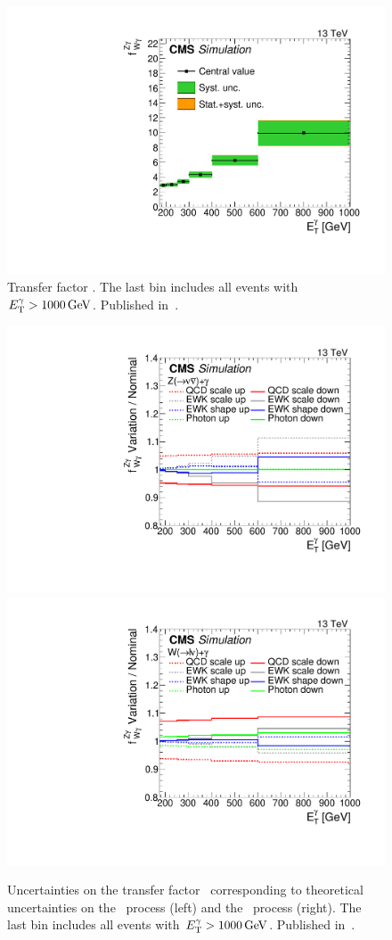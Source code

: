 \begin{figure}[htbp]
  \begin{center}
    \includegraphics[width=0.48\linewidth]{Figures/exo16053/Figure_004}
    \caption{
      Transfer factor \fZW. The last bin includes all events with $\ETgamma > 1000\unit{GeV}$. Published in~\cite{ref:JHEP02(2019)074}.
    }
    \label{fig:tf_wz}
  \end{center}
\end{figure}

\begin{figure}[htbp]
  \begin{center}
    \includegraphics[width=0.48\linewidth]{Figures/exo16053/Figure_013-a}
    \includegraphics[width=0.48\linewidth]{Figures/exo16053/Figure_013-b}
    \caption{
      Uncertainties on the transfer factor \fZW\ corresponding to theoretical uncertainties on the \zinvg\ process (left) and the \wlng\ process (right).
      The last bin includes all events with $\ETgamma > 1000\unit{GeV}$. Published in~\cite{ref:JHEP02(2019)074}.
    }
    \label{fig:tf_unc_wz}
  \end{center}
\end{figure}

